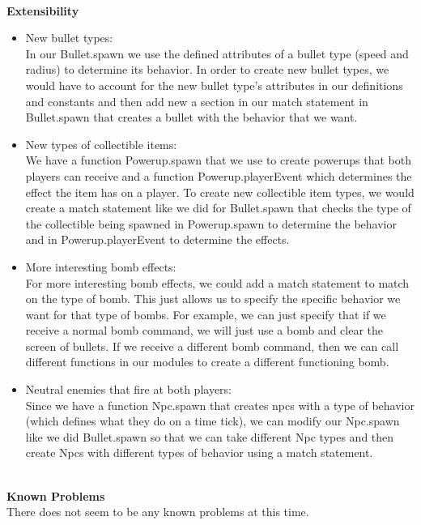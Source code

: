 \documentclass{article}[12pt]
\begin{document}
\hspace*{\fill}\\[\baselineskip]
\Large{\textbf{Extensibility}}
\hspace*{\fill}
\begin{itemize}
	\item New bullet types: \\
					In our Bullet.spawn we use the defined attributes of a bullet type (speed and radius) to determine its behavior. In order to create new bullet types, we would have to account for the new bullet type's attributes in our definitions and constants and then add new a section in our match statement in Bullet.spawn that creates a bullet with the behavior that we want.
	\item New types of collectible items: \\
					We have a function Powerup.spawn that we use to create powerups that both players can receive and a function Powerup.playerEvent which determines the effect the item has on a player. To create new collectible item types, we would create a match statement like we did for Bullet.spawn that checks the type of the collectible being spawned in Powerup.spawn to determine the behavior and in Powerup.playerEvent to determine the effects.
	\item More interesting bomb effects: \\
					For more interesting bomb effects, we could add a match statement to match on the type of bomb. This just allows us to specify the specific behavior we want for that type of bombs. For example, we can just specify that if we receive a normal bomb command, we will just use a bomb and clear the screen of bullets. If we receive a different bomb command, then we can call different functions in our modules to create a different functioning bomb. 
	\item Neutral enemies that fire at both players: \\
					Since we have a function Npc.spawn that creates npcs with a type of behavior (which defines what they do on a time tick), we can modify our Npc.spawn like we did Bullet.spawn so that we can take different Npc types and then create Npcs with different types of behavior using a match statement.
\end{itemize}
\hspace*{\fill}\\
\Large{\textbf{Known Problems}}
\hspace*{\fill}\\
There does not seem to be any known problems at this time.
\end{document}
